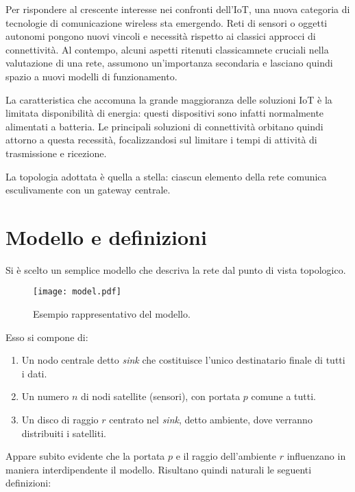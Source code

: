\documentclass[a4paper,12pt]{article}
\theoremstyle{definition}
\begin{document}

Per rispondere al crescente interesse nei confronti dell'IoT, una nuova categoria di tecnologie di comunicazione wireless sta emergendo. Reti di sensori o oggetti autonomi pongono nuovi vincoli e necessità rispetto ai classici approcci di connettività. Al contempo, alcuni aspetti ritenuti classicamnete cruciali nella valutazione di una rete, assumono un'importanza secondaria e lasciano quindi spazio a nuovi modelli di funzionamento.


La caratteristica che accomuna la grande maggioranza delle soluzioni IoT è la limitata disponibilità di energia: questi dispositivi sono infatti normalmente alimentati a batteria. Le principali soluzioni di connettività orbitano quindi attorno a questa recessità, focalizzandosi sul limitare i tempi di attività di trasmissione e ricezione.

La topologia adottata è quella a stella: ciascun elemento della rete comunica esculivamente con un gateway centrale.

\section{Modello e definizioni}

Si è scelto un semplice modello che descriva la rete dal punto di vista topologico.

\begin{figure}[h]
\centering
\texttt{[image: model.pdf]}
\caption{Esempio rappresentativo del modello.}
\end{figure}

Esso si compone di:

\begin{enumerate}
\item Un nodo centrale detto \emph{sink} che costituisce l'unico destinatario finale di tutti i dati.
\item Un numero $n$ di nodi satellite (sensori), con portata $p$ comune a tutti.
\item Un disco di raggio $r$ centrato nel \emph{sink}, detto ambiente, dove verranno distribuiti i satelliti.
\end{enumerate}

Appare subito evidente che la portata $p$ e il raggio dell'ambiente $r$ influenzano in maniera interdipendente il modello. Risultano quindi naturali le seguenti definizioni:
\end{document}
